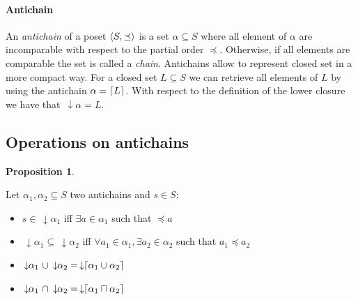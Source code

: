 \documentclass[letterpaper]{article}
\DeclarePairedDelimiter{\ceil}{\lceil}{\rceil}
\DeclarePairedDelimiter{\tuple}{\langle}{\rangle}
\newcommand{\darrow}{\, \downarrow \!\!}
\theoremstyle{definition}
\newtheorem{proposition}{Proposition}[subsection]
\begin{document}
\paragraph{Antichain}

An \textit{antichain} of a poset $\tuple{S, \preceq}$
is a set $\alpha \subseteq S$ where all element of $\alpha$
are incomparable with respect to the partial order $\preceq$.
Otherwise, if all elements are comparable the set is called a \textit{chain}.
Antichains allow to represent closed set in a more compact way.
For a closed set $L \subseteq S$ we can retrieve all elements of $L$ by using
the antichain $\alpha = \ceil{L}$. With respect
to the definition of the lower closure we have that $\darrow \alpha = L$.

\subsection{Operations on antichains}




\begin{proposition}

\label{antichains_ops}

Let $\alpha_1, \alpha_2 \subseteq S$ two antichains and $s \in S$:

\begin{itemize}
    \item $s \in \darrow \alpha_1$
    iff $\exists a \in \alpha_1$ such that $\preceq a$
    \item $\darrow \alpha_1 \subseteq \darrow \alpha_2$
    iff $\forall a_1 \in \alpha_1,
    \exists a_2 \in \alpha_2$ such that $a_1 \preceq a_2$
    \item $ \darrow \alpha_1 \ \cup \darrow \alpha_2 =
    \darrow \ceil{\alpha_1 \cup \alpha_2}$
    \item $\darrow \alpha_1 \ \cap \darrow \alpha_2 =
    \darrow \ceil{\alpha_1 \sqcap \alpha_2}$


\end{itemize}

\end{proposition}



%
%
\end{document}
